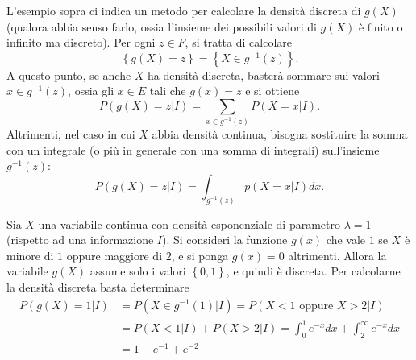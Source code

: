 \documentclass[
  italian,
  letterpaper,
]{book}
\newcommand{\cur}[1]{\left\{ #1 \right\}}
\theoremstyle{definition}
\theoremstyle{remark}
\begin{document}
L'esempio sopra ci indica un metodo per calcolare la densità discreta di
\(g(X)\) (qualora abbia senso farlo, ossia l'insieme dei possibili
valori di \(g(X)\) è finito o infinito ma discreto). Per ogni
\(z \in F\), si tratta di calcolare
\[ \cur{ g(X) = z } = \cur{X \in g^{-1}(z)}.\] A questo punto, se anche
\(X\) ha densità discreta, basterà sommare sui valori
\(x \in g^{-1}(z)\), ossia gli \(x \in E\) tali che \(g(x) = z\) e si
ottiene \[ P( g(X) = z |I)  = \sum_{x \in g^{-1}(z)} P(X = x | I). \]
Altrimenti, nel caso in cui \(X\) abbia densità continua, bisogna
sostituire la somma con un integrale (o più in generale con una somma di
integrali) sull'insieme \(g^{-1}(z)\):
\[ P(g(X) = z | I) = \int_{g^{-1}(z)} p(X=x|I) dx.\]

Sia \(X\) una variabile continua con densità esponenziale di parametro
\(\lambda=1\) (rispetto ad una informazione \(I\)). Si consideri la
funzione \(g(x)\) che vale \(1\) se \(X\) è minore di \(1\) oppure
maggiore di \(2\), e si ponga \(g(x)=0\) altrimenti. Allora la variabile
\(g(X)\) assume solo i valori \(\cur{0,1}\), e quindi è discreta. Per
calcolarne la densità discreta basta determinare
\[\begin{split} P( g(X) = 1 | I) &= P( X \in g^{-1}(1)|I) = P(X<1 \text{ oppure  } X >2 |I) \\
& =  P(X<1|I) + P(X>2|I) =\int_0^1 e^{-x}dx + \int_2^\infty e^{-x }dx \\
& = 1-e^{-1} + e^{-2}
\end{split}
\]
\end{document}

